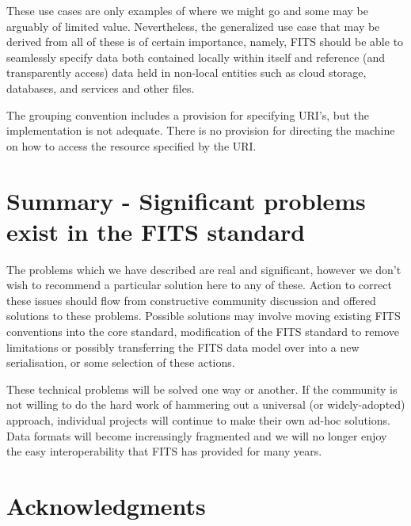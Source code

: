 \documentclass[final,authoryear,5p,times,twocolumn]{elsarticle}
\begin{document}
These use cases are only examples of where we might go and some may be
arguably of limited value. Nevertheless, the generalized use case that
may be derived from all of these is of certain importance, namely,
FITS should be able to seamlessly specify data both contained locally
within itself and reference (and transparently access) data held in
non-local entities such as cloud storage, databases, and services and
other files.


The grouping convention includes a provision for specifying URI's,
but the implementation is not adequate. There is no provision for
directing the machine on how to access the resource specified by the
URI.


\section{Summary - Significant problems exist in the FITS standard}


The problems which we have described are real and significant, however
we don't wish to recommend a particular solution here to any of
these. Action to correct these issues should flow from constructive
community discussion and offered solutions to these problems. Possible
solutions may involve moving existing FITS conventions into the core
standard, modification of the FITS standard to remove limitations or
possibly transferring the FITS data model over into a new
serialisation, or some selection of these actions.


These technical problems will be solved one way or another. If the
community is not willing to do the hard work of hammering out a
universal (or widely-adopted) approach, individual projects will
continue to make their own ad-hoc solutions. Data formats will become
increasingly fragmented and we will no longer enjoy the easy
interoperability that FITS has provided for many years.

\section{Acknowledgments}


\end{document}
